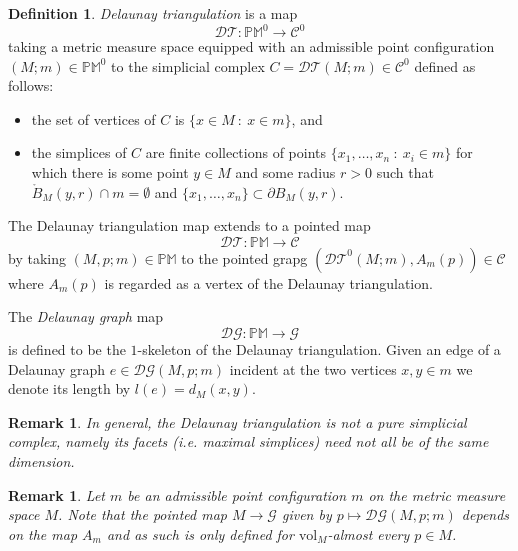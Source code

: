 \documentclass{amsart}
\newcommand{\NN}{\mathbb{N}}
\newcommand{\MP}{\mathbb{PM}}
\newcommand{\Graphs}{\mathcal{G}}
\newcommand{\Complexes}{\mathcal{C}}
\newcommand{\DelanGraph}{\mathcal{DG}}
\newcommand{\DelanComplex}{\mathcal{DT}}
\newcommand{\vol}{\mathrm{vol}}
\theoremstyle{plain}
\newtheorem{remark}[theorem]{Remark}
\numberwithin{equation}{section}
\theoremstyle{definition}
\newtheorem{definition}[theorem]{Definition}
\begin{document}
\begin{definition}
\label{def:Delaunay triangulation}    
\emph{Delaunay triangulation} is a map 
\begin{equation}
\DelanComplex : \MP^0 \to \Complexes^0
\end{equation}
taking a metric measure space equipped with an admissible point configuration $(M;m) \in \MP^0$  to the simplicial complex $C = \DelanComplex(M;m) \in \Complexes^0$ defined as follows:
\begin{itemize}
    \item the set of vertices of $C$ is $\{x \in M \: : \: x \in m\}$, and
    \item the simplices of $C$ are finite collections of points $\{x_1,\ldots,x_n \: : \: x_i \in m\} $ for which there is some point $y \in M$ and some radius $r > 0$ such that $\mathring B_M(y,r) \cap m = \emptyset$ and $\{x_1,\ldots,x_n\} \subset \partial B_M(y,r)$.
\end{itemize} 

The Delaunay triangulation map extends to a pointed map $$\DelanComplex : \MP \to \Complexes$$ 
by taking $(M,p;m) \in \MP$ to the pointed grapg $(\DelanComplex^0(M;m), A_m(p)) \in \Complexes$ where  $A_m(p)$ is regarded as a vertex of the Delaunay triangulation. 

The \emph{Delaunay graph} map 
$$\DelanGraph : \MP \to \Graphs$$
is defined to be the $1$-skeleton of the Delaunay triangulation. Given an edge of a Delaunay graph $e \in \DelanGraph(M,p;m)$ incident at the two vertices $x,y \in m$ we denote its length 
by $l(e) = d_M(x,y)$.
\end{definition}



\begin{remark}
In general, the Delaunay triangulation is not a pure simplicial complex, namely its facets (i.e. maximal simplices) need not all be of the same dimension. 
\end{remark}

\begin{remark}
Let $m$ be an admissible point configuration $m$ on the metric measure space $M$. Note that the pointed map $M\to \Graphs$ given by $p\mapsto \DelanGraph(M,p;m)$ depends on the map $A_m$ and as such is only defined for $\vol_M$-almost every $p \in M$. 
\end{remark}
\end{document}
